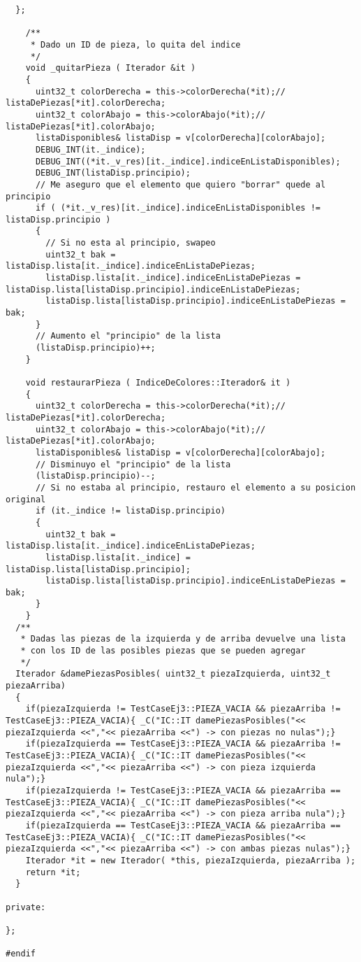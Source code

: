 \documentclass[11pt, a4paper, twoside]{article}
\begin{document}
\begin{lstlisting}
  };
  
    /**
     * Dado un ID de pieza, lo quita del indice
     */
    void _quitarPieza ( Iterador &it )
    {
      uint32_t colorDerecha = this->colorDerecha(*it);// listaDePiezas[*it].colorDerecha;
      uint32_t colorAbajo = this->colorAbajo(*it);// listaDePiezas[*it].colorAbajo;
      listaDisponibles& listaDisp = v[colorDerecha][colorAbajo];
      DEBUG_INT(it._indice);
      DEBUG_INT((*it._v_res)[it._indice].indiceEnListaDisponibles);
      DEBUG_INT(listaDisp.principio);
      // Me aseguro que el elemento que quiero "borrar" quede al principio
      if ( (*it._v_res)[it._indice].indiceEnListaDisponibles != listaDisp.principio )
      {
        // Si no esta al principio, swapeo
        uint32_t bak = listaDisp.lista[it._indice].indiceEnListaDePiezas;
        listaDisp.lista[it._indice].indiceEnListaDePiezas = listaDisp.lista[listaDisp.principio].indiceEnListaDePiezas;
        listaDisp.lista[listaDisp.principio].indiceEnListaDePiezas = bak;
      }
      // Aumento el "principio" de la lista
      (listaDisp.principio)++;
    }

    void restaurarPieza ( IndiceDeColores::Iterador& it )
    {
      uint32_t colorDerecha = this->colorDerecha(*it);// listaDePiezas[*it].colorDerecha;
      uint32_t colorAbajo = this->colorAbajo(*it);// listaDePiezas[*it].colorAbajo;
      listaDisponibles& listaDisp = v[colorDerecha][colorAbajo];
      // Disminuyo el "principio" de la lista
      (listaDisp.principio)--; 
      // Si no estaba al principio, restauro el elemento a su posicion original
      if (it._indice != listaDisp.principio)
      {
        uint32_t bak = listaDisp.lista[it._indice].indiceEnListaDePiezas;
        listaDisp.lista[it._indice] = listaDisp.lista[listaDisp.principio];
        listaDisp.lista[listaDisp.principio].indiceEnListaDePiezas = bak;
      }
    }
  /**
   * Dadas las piezas de la izquierda y de arriba devuelve una lista 
   * con los ID de las posibles piezas que se pueden agregar
   */
  Iterador &damePiezasPosibles( uint32_t piezaIzquierda, uint32_t piezaArriba)
  {
    if(piezaIzquierda != TestCaseEj3::PIEZA_VACIA && piezaArriba != TestCaseEj3::PIEZA_VACIA){ _C("IC::IT damePiezasPosibles("<< piezaIzquierda <<","<< piezaArriba <<") -> con piezas no nulas");}
    if(piezaIzquierda == TestCaseEj3::PIEZA_VACIA && piezaArriba != TestCaseEj3::PIEZA_VACIA){ _C("IC::IT damePiezasPosibles("<< piezaIzquierda <<","<< piezaArriba <<") -> con pieza izquierda nula");}
    if(piezaIzquierda != TestCaseEj3::PIEZA_VACIA && piezaArriba == TestCaseEj3::PIEZA_VACIA){ _C("IC::IT damePiezasPosibles("<< piezaIzquierda <<","<< piezaArriba <<") -> con pieza arriba nula");}
    if(piezaIzquierda == TestCaseEj3::PIEZA_VACIA && piezaArriba == TestCaseEj3::PIEZA_VACIA){ _C("IC::IT damePiezasPosibles("<< piezaIzquierda <<","<< piezaArriba <<") -> con ambas piezas nulas");}
    Iterador *it = new Iterador( *this, piezaIzquierda, piezaArriba );
    return *it;
  }

private:
  
};

#endif

\end{lstlisting}
\clearpage
\end{document}
